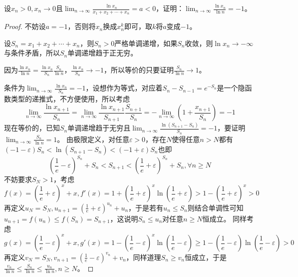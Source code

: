 \documentclass[../../main.tex]{subfiles}%
\begin{document}
\begin{example}
设\(x_n>0,x_n\rightarrow0\)且\(\lim_{n\rightarrow\infty}\frac{\ln x_n}{x_1 + x_2+\cdots + x_n}=a<0\)，证明：\(\lim_{n\rightarrow\infty}\frac{\ln x_n}{\ln n}=-1\)。
\end{example}
\begin{proof}
不妨设\(a = -1\)，否则将\(x_n\)换成\(x_n^k\)即可，取\(k\)将\(a\)变成\(-1\)。

设\(S_n=x_1 + x_2+\cdots + x_n\)，则\(S_n>0\)严格单调递增，如果\(S_n\)收敛，则\(\ln x_n\rightarrow-\infty\)与条件矛盾，所以\(S_n\)单调递增趋于正无穷。

因为\(\frac{\ln x_n}{\ln n}=\frac{\ln x_n}{S_n}\frac{S_n}{\ln n}\)，\(\frac{\ln x_n}{S_n}\rightarrow -1\)，所以等价的只要证明\(\frac{S_n}{\ln n}\rightarrow1\)。

条件为\(\lim_{n\rightarrow\infty}\frac{\ln x_n}{S_n}=-1\)，设想作为等式，对应着\(S_n - S_{n - 1}=e^{-S_n}\)是一个隐函数类型的递推式，不方便使用，所以考虑
\[\lim_{n\rightarrow\infty}\frac{\ln x_{n + 1}}{S_n}=\lim_{n\rightarrow\infty}\frac{\ln x_{n + 1}}{S_{n + 1}}\frac{S_{n + 1}}{S_n}=-\lim_{n\rightarrow\infty}\left(1+\frac{x_{n + 1}}{S_n}\right)=-1\]
现在等价的，已知\(S_n\)单调递增趋于无穷且\(\lim_{n\rightarrow\infty}\frac{\ln(S_{n + 1}-S_n)}{S_n}=-1\)，要证明\(\lim_{n\rightarrow\infty}\frac{S_n}{\ln n}=1\)。
由极限定义，对任意\(\varepsilon>0\)，存在\(N\)使得任意\(n > N\)都有\((-1-\varepsilon)S_n<\ln(S_{n + 1}-S_n)<(-1 + \varepsilon)S_n\)也即
\[\left(\frac{1}{e}-\varepsilon\right)^{S_n}+S_n<S_{n + 1}<\left(\frac{1}{e}+\varepsilon\right)^{S_n}+S_n,\forall n\geqslant  N\]
不妨要求\(S_N>1\)，考虑
\[f(x)=\left(\frac{1}{e}+\varepsilon\right)^{x}+x,f'(x)=1+\left(\frac{1}{e}+\varepsilon\right)^{x}\ln\left(\frac{1}{e}+\varepsilon\right)>1-\left(\frac{1}{e}+\varepsilon\right)^{x}>0\]
再定义\(u_N = S_N,u_{n + 1}=\left(\frac{1}{e}+\varepsilon\right)^{u_n}+u_n\)，于是若有\(u_n\leqslant  S_n\)则结合单调性可知\(u_{n + 1}=f(u_n)\leqslant  f(S_n)=S_{n + 1}\)，这说明\(S_n\leqslant  u_n\)对任意\(n\geqslant  N\)恒成立。
同样考虑
\[g(x)=\left(\frac{1}{e}-\varepsilon\right)^{x}+x,g'(x)=1-\left(\frac{1}{e}-\varepsilon\right)^{x}\ln\left(\frac{1}{e}-\varepsilon\right)\geqslant 1-\left(\frac{1}{e}-\varepsilon\right)\ln\left(\frac{1}{e}-\varepsilon\right)>0\]
再定义\(v_N = S_N,v_{n + 1}=\left(\frac{1}{e}-\varepsilon\right)^{v_n}+v_n\)，同样道理\(S_n\geqslant  v_n\)恒成立，于是\(\frac{v_n}{\ln n}\leqslant \frac{S_n}{\ln n}\leqslant \frac{u_n}{\ln n},n\geqslant  N\)。


\end{proof}
\end{document}
